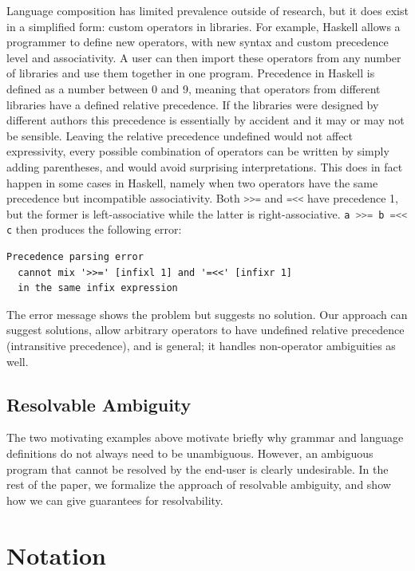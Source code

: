 \documentclass[runningheads]{llncs}
\newcommand{\haskell}{\lstinline[language=haskell]}
\begin{document}
Language composition has limited prevalence outside of research, but it does exist in a simplified form: custom operators in libraries. For example, Haskell allows a programmer to define new operators, with new syntax and custom precedence level and associativity. A user can then import these operators from any number of libraries and use them together in one program. Precedence in Haskell is defined as a number between 0 and 9, meaning that operators from different libraries have a defined relative precedence. If the libraries were designed by different authors this precedence is essentially by accident and it may or may not be sensible. Leaving the relative precedence undefined would not affect expressivity, every possible combination of operators can be written by simply adding parentheses, and would avoid surprising interpretations. This does in fact happen in some cases in Haskell, namely when two operators have the same precedence but incompatible associativity. Both \haskell{>>=} and \haskell{=<<} have precedence 1, but the former is left-associative while the latter is right-associative. \haskell{a >>= b =<< c} then produces the following error:

\begin{lstlisting}
Precedence parsing error
  cannot mix '>>=' [infixl 1] and '=<<' [infixr 1]
  in the same infix expression
\end{lstlisting}

\noindent The error message shows the problem but suggests no solution. Our approach can suggest solutions, allow arbitrary operators to have undefined relative precedence (intransitive precedence), and is general; it handles non-operator ambiguities as well.

\subsection{Resolvable Ambiguity}
The two motivating examples above motivate briefly why grammar
and language definitions do not always need to be unambiguous. However, an
ambiguous program that cannot be resolved by the end-user is clearly
undesirable. In the rest of the paper, we formalize the approach of
resolvable ambiguity, and show how we can give guarantees for
resolvability.




\section{Notation}
\label{sec:prel}
\end{document}
